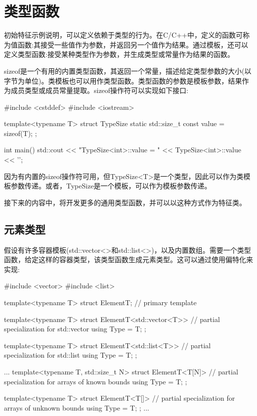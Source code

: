 \section{类型函数}

初始特征示例说明，可以定义依赖于类型的行为。在C/C++中，定义的函数可称为值函数:其接受一些值作为参数，并返回另一个值作为结果。通过模板，还可以定义类型函数:接受某种类型作为参数，并生成类型或常量作为结果的函数。

sizeof是一个有用的内置类型函数，其返回一个常量，描述给定类型参数的大小(以字节为单位)。类模板也可以用作类型函数。类型函数的参数是模板参数，结果作为成员类型或成员常量提取。sizeof操作符可以实现如下接口:

\begin{cpp}
#include <cstddef>
#include <iostream>

template<typename T>
struct TypeSize {
	static std::size_t const value = sizeof(T);
};

int main()
{
	std::cout << "TypeSize<int>::value = "
	<< TypeSize<int>::value << '\n';
}
\end{cpp}

因为有内置的sizeof操作符可用，但TypeSize<T>是一个类型，因此可以作为类模板参数传递。或者，TypeSize是一个模板，可以作为模板参数传递。

接下来的内容中，将开发更多的通用类型函数，并可以以这种方式作为特征类。

\subsection{元素类型}

假设有许多容器模板(std::vector<>和std::list<>)，以及内置数组。需要一个类型函数，给定这样的容器类型，该类型函数生成元素类型。这可以通过使用偏特化来实现:

\begin{cpp}
#include <vector>
#include <list>

template<typename T>
struct ElementT; // primary template

template<typename T>
struct ElementT<std::vector<T>> { // partial specialization for std::vector
	using Type = T;
};

template<typename T>
struct ElementT<std::list<T>> { // partial specialization for std::list
	using Type = T;
};

...
template<typename T, std::size_t N>
struct ElementT<T[N]> { // partial specialization for arrays of known bounds
	using Type = T;
};

template<typename T>
struct ElementT<T[]> { // partial specialization for arrays of unknown bounds
	using Type = T;
};
...
\end{cpp}

